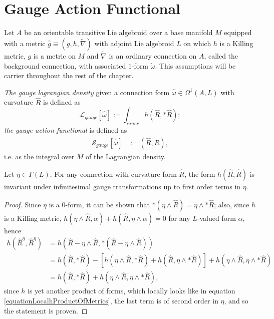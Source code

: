 \section{Gauge Action Functional}

Let $A$ be an orientable transitive Lie algebroid over a base manifold $M$ equipped with a metric $\hat g \equiv (g, h, \tilde \nabla)$ with adjoint Lie algebroid $L$ on which $h$ is a Killing metric, $g$ is a metric on $M$ and $\tilde \nabla$ is an ordinary connection on $A$, called the background connection, with associated $1$-form $\tilde \omega$. This assumptions will be carrier throughout the rest of the chapter.

\begin{definition}\label{definitionGaugeActionLagrangian}
\emph{The gauge lagrangian density} given a connection form $\hat \omega \in \Omega^1(A, L)$ with curvature $\hat R$ is defined as
\begin{equation}
    \mathcal L_{gauge}[\hat \omega] := \int_{inner} h(\hat R, *\hat R);
\end{equation}
\emph{the gauge action functional} is defined as 
\begin{align}
    \mathcal S_{gauge}[\hat \omega]& := (\hat R, \hat R),
\end{align}
i.e. as the integral over $M$ of the Lagrangian density.
\end{definition}

\begin{lemma}\label{lemmaIntegrationFOrmGaugeActionTHeoryhRRisInvariantGaugeTransforamtions}
Let $\eta \in \Gamma(L)$. For any connection with curvature form $\hat R$, the form $h(\hat R, \hat R)$ is invariant under infinitesimal gauge transformations up to first order terms in $\eta$.
\end{lemma}
\begin{proof}
Since $\eta$ is a $0$-form, it can be shown that $*(\eta \wedge \hat R) = \eta \wedge *\hat R$; also, since $h$ is a Killing metric, $h(\eta \wedge \hat R, \alpha) + h(\hat R, \eta \wedge \alpha) = 0$ for any $L$-valued form $\alpha$, hence
\begin{align*}
    h(\hat R^\eta, \hat R^\eta) 
        &=h( \hat R - \eta \wedge \hat R, *(\hat R - \eta \wedge \hat R)) \\
        &= h(\hat R, *\hat R) - [h(\eta \wedge \hat R, *\hat R) + h(\hat R, \eta \wedge *\hat R)] + h(\eta \wedge \hat R, \eta \wedge *\hat R)\\
        &= h(\hat R, *\hat R) + h(\eta \wedge \hat R, \eta \wedge *\hat R),
\end{align*}
since $h$ is yet another product of forms, which locally looks like in equation \eqref{equationLocalhProductOfMetrics}, the last term is of second order in $\eta$, and so the statement is proven.
\end{proof}


